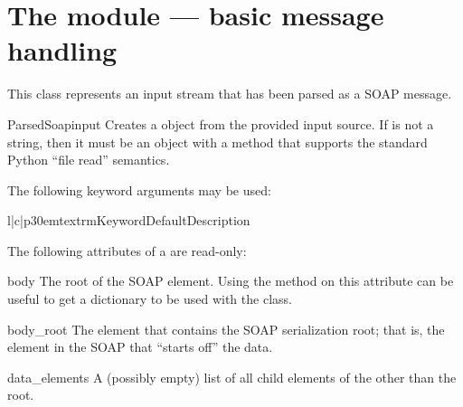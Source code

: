 \chapter{The  module --- basic message handling}

This class represents an input stream that has been parsed as a SOAP
message.

\begin{classdesc}{ParsedSoap}{input}
Creates a  object from the provided input source.
If  is not a string, then it must be an object with a
 method that supports the standard Python ``file read''
semantics.

The following keyword arguments may be used:

\begin{tableiii}{l|c|p{30em}}{textrm}{Keyword}{Default}{Description}
\end{tableiii}

\end{classdesc}

The following attributes of a  are read-only:

\begin{memberdesc}{body}
The root of the SOAP  element.
Using the  method on this attribute can be useful
to get a dictionary to be used with the  class.
\end{memberdesc}

\begin{memberdesc}{body_root}
The element that contains the SOAP serialization root; that is,
the element in the SOAP  that ``starts off'' the data.
\end{memberdesc}

\begin{memberdesc}{data_elements}
A (possibly empty) list of all child elements of the  other
than the root.
\end{memberdesc}

